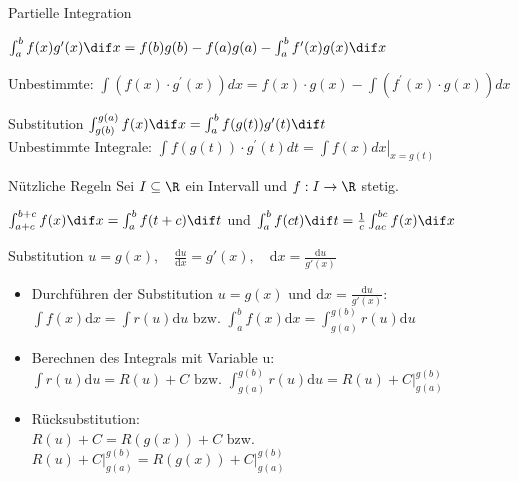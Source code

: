 \begin{theorem}{Partielle Integration}

	$\int_a^b f(x) g'(x) \dif x = f(b) g(b) - f(a) g(a) - \int_a^b f'(x)g(x) \dif x$
   
   Unbestimmte:
   $
   \int(f(x) \cdot g^{\prime}(x)) d x=f(x) \cdot g(x)-\int(f^{\prime}(x) \cdot g(x)) d x
   $
\end{theorem}




\begin{theorem}{Substitution}
    $\int_{g(b)}^{g(a)} f(x) \dif x = \int_{a}^b f(g(t)) g'(t) \dif t$
    \vspace{1mm}\\
   Unbestimmte Integrale: $\int f(g(t)) \cdot g^{\prime}(t) d t=\left.\int f(x) d x\right|_{x=g(t)}$
\end{theorem}

\begin{corollary}{Nützliche Regeln}
	Sei $I \subseteq \R$ ein Intervall und $f: I \to \R$ stetig.
    
    $\int_{a+c}^{b+c} f(x) \dif x = \int_{a}^{b} f(t+c) \dif t$ und $\int_{a}^{b} f(ct) \dif t = \frac{1}{c} \int_{ac}^{bc} f(x) \dif x$
\end{corollary}

\begin{KR}{Substitution}
    $u=g(x),\quad \frac{\mathrm{d}u}{\mathrm{d}x}=g'(x),\quad \mathrm{d}x = \frac{\mathrm{d}u}{g'(x)} $
    \begin{itemize}
	\item Durchführen der Substitution \(u=g(x) \)	 und \(\mathrm{d}x=\frac{\mathrm{d}u}{g'(x)} \):\\
	    $\int{f(x)\mathrm{d}x}=\int{r(u)}{\mathrm{d}u} \text{ bzw. } \int_a^b{f(x)\mathrm{d}x}=\int_{g(a)}^{g(b)}{r(u)}{\mathrm{d}u}$
	\item Berechnen des Integrals mit Variable u:\\
	    $\int{r(u)\mathrm{d}u}=R(u)+C \text{ bzw. } \int_{g(a)}^{g(b)}{r(u)\mathrm{d}u}=R(u)+C\Big|_{g(a)}^{g(b)}$
	\item Rücksubstitution:\\
	    $R(u)+C=R(g(x))+C$ bzw. $R(u)+C\Big|_{g(a)}^{g(b)}=R(g(x))+C\Big|_{g(a)}^{g(b)}$
    \end{itemize}	
\end{KR}


